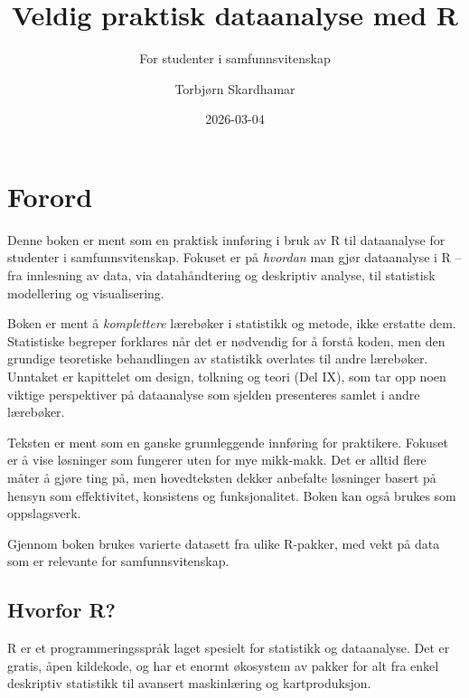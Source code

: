 \documentclass[
  norsk,
  letterpaper,
  DIV=11,
  numbers=noendperiod]{scrreprt}
\title{Veldig praktisk dataanalyse med R}
\subtitle{For studenter i samfunnsvitenskap}
\author{Torbjørn Skardhamar}
\date{2026-03-04}
\renewcommand*\contentsname{Innholdsfortegnelse}
\newcommand\contentsname{Innholdsfortegnelse}
\theoremstyle{definition}
\theoremstyle{remark}
\begin{document}
\maketitle

\renewcommand*\contentsname{Innholdsfortegnelse}
{
\hypersetup{linkcolor=}
\setcounter{tocdepth}{2}
\tableofcontents
}


\chapter*{Forord}\label{forord}


Denne boken er ment som en praktisk innføring i bruk av R til
dataanalyse for studenter i samfunnsvitenskap. Fokuset er på
\emph{hvordan} man gjør dataanalyse i R -- fra innlesning av data, via
datahåndtering og deskriptiv analyse, til statistisk modellering og
visualisering.

Boken er ment å \emph{komplettere} lærebøker i statistikk og metode,
ikke erstatte dem. Statistiske begreper forklares når det er nødvendig
for å forstå koden, men den grundige teoretiske behandlingen av
statistikk overlates til andre lærebøker. Unntaket er kapittelet om
design, tolkning og teori (Del IX), som tar opp noen viktige
perspektiver på dataanalyse som sjelden presenteres samlet i andre
lærebøker.

Teksten er ment som en ganske grunnleggende innføring for praktikere.
Fokuset er å vise løsninger som fungerer uten for mye mikk-makk. Det er
alltid flere måter å gjøre ting på, men hovedteksten dekker anbefalte
løsninger basert på hensyn som effektivitet, konsistens og
funksjonalitet. Boken kan også brukes som oppslagsverk.

Gjennom boken brukes varierte datasett fra ulike R-pakker, med vekt på
data som er relevante for samfunnsvitenskap.

\section*{Hvorfor R?}\label{hvorfor-r}


R er et programmeringsspråk laget spesielt for statistikk og
dataanalyse. Det er gratis, åpen kildekode, og har et enormt økosystem
av pakker for alt fra enkel deskriptiv statistikk til avansert
maskinlæring og kartproduksjon.
\end{document}
